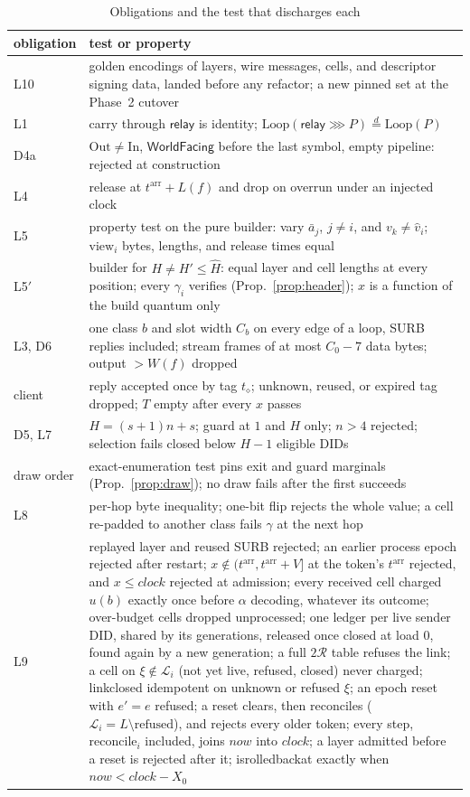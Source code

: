 \documentclass[journal]{IEEEtran}
\newcommand{\then}{\mathbin{\ggg}}
\newcommand{\relay}{\mathsf{relay}}
\newcommand{\WF}{\mathsf{WorldFacing}}
\newcommand{\cl}{\diamond}
\newcommand{\view}{\mathrm{view}}
\newcommand{\LoopOf}{\mathrm{Loop}}
\newcommand{\In}{\mathrm{In}}
\newcommand{\Out}{\mathrm{Out}}
\newcommand{\arr}{t^{\mathrm{arr}}}
\newcommand{\eqd}{\overset{d}{=}}
\newcommand{\Hm}{\hat H}
\newcommand{\vh}[1]{\hat v_{#1}}
\DeclareRobustCommand{\code}[1]{{\ttfamily\renewcommand{\_}{\textunderscore\allowbreak}#1}}
\begin{document}
\begin{table}[t]
\caption{Obligations and the test that discharges each}
\label{tab:obligations}
\centering\small
\begin{tabular}{@{}>{\raggedright\arraybackslash}p{}>{\raggedright\arraybackslash}p{}@{}}
\toprule
obligation & test or property \\
\midrule
L10 & golden encodings of layers, wire messages, cells, and descriptor signing data, landed before any refactor; a new pinned set at the Phase~2 cutover \\
L1 & carry through $\relay$ is identity; $\LoopOf(\relay\then P)\eqd\LoopOf(P)$ \\
D4a & $\Out\ne\In$, $\WF$ before the last symbol, empty pipeline: rejected at construction \\
L4 & release at $\arr+L(f)$ and drop on overrun under an injected clock \\
L5 & property test on the pure builder: vary $\bar a_j$, $j\ne i$, and $v_k\ne\vh i$; $\view_i$ bytes, lengths, and release times equal \\
L5$'$ & builder for $H\ne H'\le\Hm$: equal layer and cell lengths at every position; every $\gamma_i$ verifies (Prop.~\ref{prop:header}); $x$ is a function of the build quantum only \\
L3, D6 & one class $b$ and slot width $C_b$ on every edge of a loop, SURB replies included; stream frames of at most $C_0-7$ data bytes; output $>W(f)$ dropped \\
client & reply accepted once by tag $t_\cl$; unknown, reused, or expired tag dropped; $T$ empty after every $x$ passes \\
D5, L7 & $H=(s+1)n+s$; guard at $1$ and $H$ only; $n>4$ rejected; selection fails closed below $H-1$ eligible DIDs \\
draw order & exact-enumeration test pins exit and guard marginals (Prop.~\ref{prop:draw}); no draw fails after the first succeeds \\
L8 & per-hop byte inequality; one-bit flip rejects the whole value; a cell re-padded to another class fails $\gamma$ at the next hop \\
L9 & replayed layer and reused SURB rejected; an earlier process epoch rejected after restart; $x\notin(\arr,\arr+V]$ at the token's $\arr$ rejected, and $x\le\mathit{clock}$ rejected at admission; every received cell charged $u(b)$ exactly once before $\alpha$ decoding, whatever its outcome; over-budget cells dropped unprocessed; one ledger per live sender DID, shared by its generations, released once closed at load $0$, found again by a new generation; a full $2\mathcal R$ table refuses the link; a cell on $\xi\notin\mathcal L_i$ (not yet live, refused, closed) never charged; \code{link\_closed} idempotent on unknown or refused $\xi$; an epoch reset with $e'=e$ refused; a reset clears, then reconciles ($\mathcal L_i=L\setminus\mathrm{refused}$), and rejects every older token; every step, $\mathrm{reconcile}_i$ included, joins $\mathit{now}$ into $\mathit{clock}$; a layer admitted before a reset is rejected after it; \code{is\_rolled\_back\_at} exactly when $\mathit{now}<\mathit{clock}-X_0$ \\

\end{tabular}
\end{table}
\end{document}
